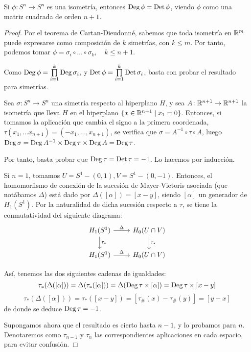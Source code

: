 \begin{lemma}
  Si $\phi \colon S^n \to S^n$ es una isometría, entonces $\operatorname{Deg} \phi = \operatorname{Det} \phi$, viendo $\phi$ como una matriz cuadrada
  de orden $n+1$.
\end{lemma}

\begin{proof}
  Por el teorema de Cartan-Dieudonné, sabemos que toda isometría en $\mathbb{R}^m$ puede expresarse como composición de
  $k$ simetrías, con $k \leq m$. Por tanto, podemos tomar $\phi = \sigma_i \circ \dots \circ \sigma_k, \quad k \leq n+1$.

  Como $\operatorname{Deg} \phi = \prod\limits_{i = 1}^k \operatorname{Deg} \sigma_i$, y $\operatorname{Det} \phi = \prod\limits_{i = 1}^k \operatorname{Det} \sigma_i$,
  basta con probar el resultado para simetrías.

  Sea $\sigma \colon S^n \to S^n$ una simetría respecto al hiperplano $H$, y sea $A \colon \mathbb{R}^{n+1} \to \mathbb{R}^{n+1}$ la isometría
  que lleva $H$ en el hiperplano $\{x \in \mathbb{R}^{n+1} \mid x_1 = 0\}$. Entonces, si tomamos la aplicación que cambia el signo a la primera
  coordenada, $\tau(x_1, \dots x_{n+1}) = (-x_1, \dots, x_{n+1})$, se verifica que $\sigma = A^{-1} \circ \tau \circ A$, luego
  $\operatorname{Deg} \sigma = \operatorname{Deg} A^{-1} \times \operatorname{Deg} \tau \times \operatorname{Deg} A = \operatorname{Deg} \tau$.

  Por tanto, basta probar que $\operatorname{Deg} \tau = \operatorname{Det} \tau = -1$. Lo hacemos por inducción.

  Si $n = 1$, tomamos $U = S^1 - (0, 1), V = S^1 - (0, -1)$. Entonces, el homomorfismo de conexión de la sucesión
  de Mayer-Vietoris asociada (que notábamos $\Delta$) está dado por $\Delta([\alpha]) = [x-y]$, siendo $[\alpha]$ un generador de $H_1(S^1)$.
  Por la naturalidad de dicha sucesión respecto a $\tau$, se tiene la conmutatividad del siguiente diagrama:
  \[ \begin{tikzcd}
    H_1(S^1) \arrow{r}{\Delta} \arrow{d}{\tau_*} & H_0(U \cap V) \arrow{d}{\tau_*} \\
    H_1(S^1) \arrow{r}{\Delta} & H_0(U \cap V)
  \end{tikzcd} \]

  Así, tenemos las dos siguientes cadenas de igualdades:
  \[\tau_*(\Delta([\alpha])) = \Delta(\tau_*([\alpha])) = \Delta(\operatorname{Deg} \tau \times [\alpha]) = \operatorname{Deg} \tau \times [x-y]\]
  \[\tau_*(\Delta([\alpha])) = \tau_*([x-y]) = [\tau_\#(x) - \tau_\#(y)] = [y - x] \]
  de donde se deduce $\operatorname{Deg} \tau = -1$.

  Supongamos ahora que el resultado es cierto hasta $n-1$, y lo probamos para $n$. Denotaremos como $\tau_{n-1}$ y $\tau_{n}$
  las correspondientes aplicaciones en cada espacio, para evitar confusión.


\end{proof}
